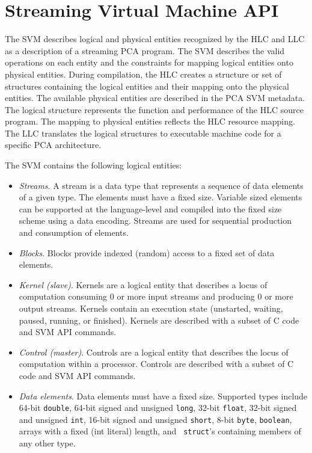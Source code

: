 \section{Streaming Virtual Machine API}

The SVM describes logical and physical entities recognized by the HLC
and LLC as a description of a streaming PCA program.  The SVM
describes the valid operations on each entity and the constraints for
mapping logical entities onto physical entities.  During compilation,
the HLC creates a structure or set of structures containing the
logical entities and their mapping onto the physical entities.  The
available physical entities are described in the PCA SVM metadata.
The logical structure represents the function and performance of the
HLC source program.  The mapping to physical entities reflects the HLC
resource mapping.  The LLC translates the logical structures to
executable machine code for a specific PCA architecture.


The SVM contains the following logical entities:

\begin{itemize}

\item {\it Streams}.  A stream is a data type that represents a
sequence of data elements of a given type.  The elements must have a
fixed size. Variable sized elements can be supported at the
language-level and compiled into the fixed size scheme using a data
encoding.  Streams are used for sequential production and consumption
of elements.

\item {\it Blocks}. Blocks provide indexed (random) access to a fixed
set of data elements.

\item {\it Kernel (slave)}. Kernels are a logical entity that
describes a locus of computation consuming 0 or more input streams and
producing 0 or more output streams.  Kernels contain an execution
state (unstarted, waiting, paused, running, or finished).  Kernels are
described with a subset of C code and SVM API commands.

\item {\it Control (master)}. Controls are a logical entity that
describes the locus of computation within a processor.  Controls are
described with a subset of C code and SVM API commands.

\item {\it Data elements}. Data elements must have a fixed
size. Supported types include 64-bit {\tt double}, 64-bit signed and
unsigned {\tt long}, 32-bit {\tt float}, 32-bit signed and unsigned
{\tt int}, 16-bit signed and unsigned {\tt short}, 8-bit {\tt byte},
{\tt boolean}, arrays with a fixed (int literal) length, and {\tt
struct}'s containing members of any other type.

\end{itemize}

